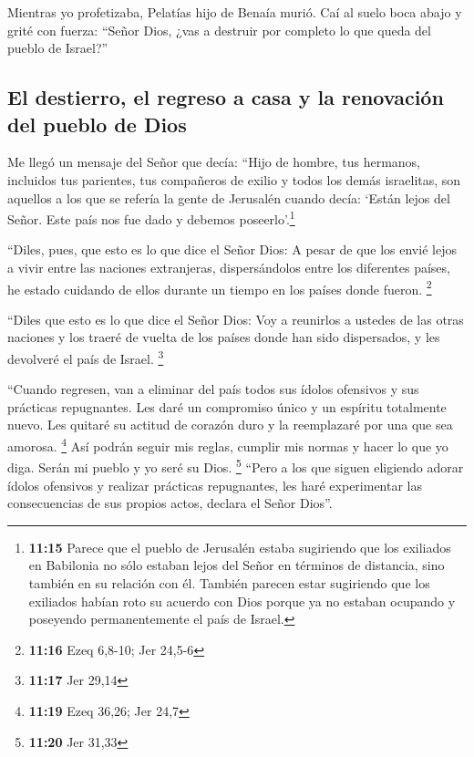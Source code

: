  Mientras yo profetizaba, Pelatías hijo de Benaía murió.
Caí al suelo boca abajo y grité con fuerza: ``Señor Dios, ¿vas a
destruir por completo lo que queda del pueblo de Israel?''

\hypertarget{el-destierro-el-regreso-a-casa-y-la-renovaciuxf3n-del-pueblo-de-dios}{%
\subsection{El destierro, el regreso a casa y la renovación del pueblo
de
Dios}\label{el-destierro-el-regreso-a-casa-y-la-renovaciuxf3n-del-pueblo-de-dios}}

 Me llegó un mensaje del Señor que decía: 
``Hijo de hombre, tus hermanos, incluidos tus parientes, tus compañeros
de exilio y todos los demás israelitas, son aquellos a los que se
refería la gente de Jerusalén cuando decía: `Están lejos del Señor. Este
país nos fue dado y debemos poseerlo'.\footnote{\textbf{11:15} Parece
  que el pueblo de Jerusalén estaba sugiriendo que los exiliados en
  Babilonia no sólo estaban lejos del Señor en términos de distancia,
  sino también en su relación con él. También parecen estar sugiriendo
  que los exiliados habían roto su acuerdo con Dios porque ya no estaban
  ocupando y poseyendo permanentemente el país de Israel.}

 ``Diles, pues, que esto es lo que dice el Señor Dios: A
pesar de que los envié lejos a vivir entre las naciones extranjeras,
dispersándolos entre los diferentes países, he estado cuidando de ellos
durante un tiempo en los países donde fueron. \footnote{\textbf{11:16}
  Ezeq 6,8-10; Jer 24,5-6}

 ``Diles que esto es lo que dice el Señor Dios: Voy a
reunirlos a ustedes de las otras naciones y los traeré de vuelta de los
países donde han sido dispersados, y les devolveré el país de Israel.
\footnote{\textbf{11:17} Jer 29,14}

 ``Cuando regresen, van a eliminar del país todos sus
ídolos ofensivos y sus prácticas repugnantes.  Les daré
un compromiso único y un espíritu totalmente nuevo. Les quitaré su
actitud de corazón duro y la reemplazaré por una que sea amorosa.
\footnote{\textbf{11:19} Ezeq 36,26; Jer 24,7}  Así
podrán seguir mis reglas, cumplir mis normas y hacer lo que yo diga.
Serán mi pueblo y yo seré su Dios. \footnote{\textbf{11:20} Jer 31,33}
 ``Pero a los que siguen eligiendo adorar ídolos
ofensivos y realizar prácticas repugnantes, les haré experimentar las
consecuencias de sus propios actos, declara el Señor Dios''.

